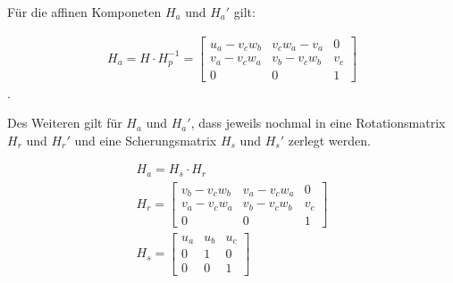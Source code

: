 Für die affinen Komponeten $H_a$ und $H_a'$ gilt:

\begin{gather}
	H_a= H \cdot H^{-1}_p = 
	\begin{bmatrix}
		u_a-v_cw_b&v_cw_a-v_a&0\\
		v_a-v_cw_a&v_b-v_cw_b&v_c\\
		0&0&1
	\end{bmatrix}
\end{gather}
.


Des Weiteren gilt für $H_a$ und $H_a'$, dass jeweils nochmal in eine Rotationsmatrix $H_r$ und $H_r'$ und eine Scherungsmatrix $H_s$ und $H_s'$ zerlegt werden\cite{ZZ,phdextrinsicPara}.


\begin{gather}
	H_a = H_s \cdot H_r\\
	H_r = 
	\begin{bmatrix}
		v_b-v_cw_b&	v_a-v_cw_a&0\\
		v_a-v_cw_a&v_b-v_cw_b&v_c\\
		0&0&1
	\end{bmatrix}\\
	H_s = 
	\begin{bmatrix}
		u_a&u_b&u_c\\
		0&1&0\\
		0&0&1
	\end{bmatrix}
\end{gather}\\


